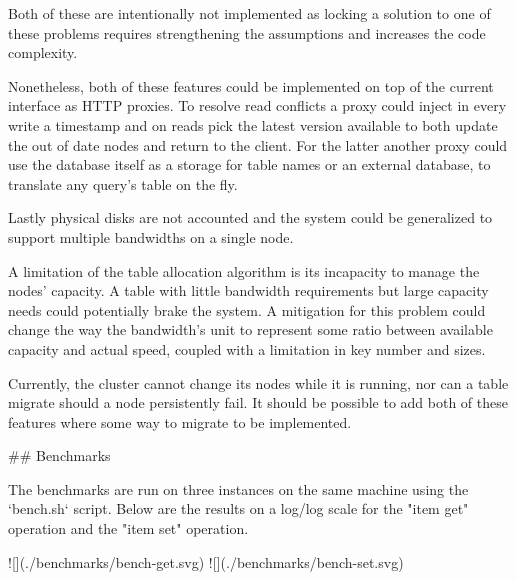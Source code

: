 Both of these are intentionally not implemented as locking a solution to one of these problems
 requires strengthening the assumptions and increases the code complexity.

Nonetheless, both of these features could be implemented on top of the current interface as HTTP proxies.
To resolve read conflicts a proxy could inject in every write a timestamp 
 and on reads pick the latest version available to both update the out of date nodes and return to the client.  
For the latter another proxy could use the database itself as a storage for table names or an external database,
 to translate any query's table on the fly.

Lastly physical disks are not accounted and the system 
 could be generalized to support multiple bandwidths on a single node.

A limitation of the table allocation algorithm is its incapacity to manage the nodes' capacity.
 A table with little bandwidth requirements but large capacity needs could potentially brake the system.
A mitigation for this problem could change the way the bandwidth's unit to represent
 some ratio between available capacity and actual speed, coupled with a limitation in key number and sizes.

Currently, the cluster cannot change its nodes while it is running, 
 nor can a table migrate should a node persistently fail.
It should be possible to add both of these features 
 where some way to migrate to be implemented.  

## Benchmarks

The benchmarks are run on three instances on the same machine using the `bench.sh` script.
Below are the results on a log/log scale for the "item get" operation and the "item set" operation.

![](./benchmarks/bench-get.svg)
![](./benchmarks/bench-set.svg)
